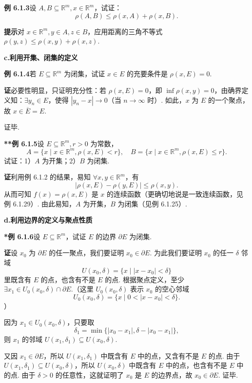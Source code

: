 \documentclass[UTF8, 12pt, fontset=fandol, oneside]{ctexart}
\begin{document}
\noindent\textbf{例 6.1.3}\quad 设 $A,B\subseteq\mathbb{R}^m,x\in\mathbb{R}^m$，试证：
\[
  \rho(A,B)\le \rho(x,A)+\rho(x,B).
\]

\noindent\textbf{提示}\quad 对 $x\in\mathbb{R}^m,y\in A,z\in B$，应用距离的三角不等式 $\rho(y,z)\le \rho(x,y)+\rho(x,z)$.

\noindent\textbf{c.\quad 利用开集、闭集的定义}

\noindent\textbf{例 6.1.4}\quad 若 $E\subseteq\mathbb{R}^m$ 为闭集，试证 $x\in E$ 的充要条件是 $\rho(x,E)=0$.

\noindent\textbf{证}\quad 必要性明显，只证明充分性：若 $\rho(x,E)=0$，即 $\inf\rho(x,y)=0$，由确界定义知：$\exists y_n\in E$，使得 $|y_n-x|\to0$（当 $n\to\infty$ 时）. 如此，$x$ 为 $E$ 的一个聚点，故 $x\in\overline{E}=E$.

证毕.

\noindent\textbf{**例 6.1.5}\quad 设 $E\subseteq\mathbb{R}^m,r>0$ 为常数，
\[
  A=\{x\mid x\in\mathbb{R}^m,\rho(x,E)<r\},\quad
  B=\{x\mid x\in\mathbb{R}^m,\rho(x,E)\le r\}.
\]
试证：1）$A$ 为开集；2）$B$ 为闭集.

\noindent\textbf{证}\quad 利用例 6.1.2 的结果，易知 $\forall x,y\in\mathbb{R}^m$，有
\[
  |\rho(x,E)-\rho(y,E)|\le \rho(x,y).
\]
从而可知 $f(x)=\rho(x,E)$ 是 $x$ 的连续函数（更确切地说是一致连续函数，见例 6.1.29）. 由此易知，$A$ 为开集，$B$ 为闭集（见例 6.1.25）.

\noindent\textbf{d.\quad 利用边界的定义与聚点性质}

\noindent\textbf{*例 6.1.6}\quad 设 $E\subseteq\mathbb{R}^m$，试证 $E$ 的边界 $\partial E$ 为闭集.

\noindent\textbf{证}\quad 设 $x_0$ 为 $\partial E$ 的任一聚点，我们要证明 $x_0\in\partial E$. 为此我们要证明 $x_0$ 的任一 $\delta$ 邻域
\[
  U(x_0,\delta)=\{x\mid |x-x_0|<\delta\}
\]
里既含有 $E$ 的点，也含有不是 $E$ 的点. 根据聚点定义，至少 $\exists x_1\in U_0(x_0,\delta)\cap\partial E$.（这里 $U_0(x_0,\delta)$ 表示 $x_0$ 的空心邻域
\[
  U_0(x_0,\delta)=\{x\mid 0<|x-x_0|<\delta\}.
\]
）

因为 $x_1\in U_0(x_0,\delta)$，只要取
\[
  \delta_1=\min\{|x_0-x_1|,\delta-|x_0-x_1|\},
\]
则 $x_1$ 的邻域 $U(x_1,\delta_1)\subseteq U(x_0,\delta)$.

又因 $x_1\in\partial E$，所以 $U(x_1,\delta_1)$ 中既含有 $E$ 中的点，又含有不是 $E$ 的点. 由于 $U(x_1,\delta_1)\subseteq U(x_0,\delta)$，所以 $U(x_0,\delta)$ 中既含有 $E$ 中的点，也含有不是 $E$ 中的点. 由于 $\delta>0$ 的任意性，这就证明了 $x_0$ 是 $E$ 的边界点，故 $x_0\in\partial E$. 证毕.
\end{document}
